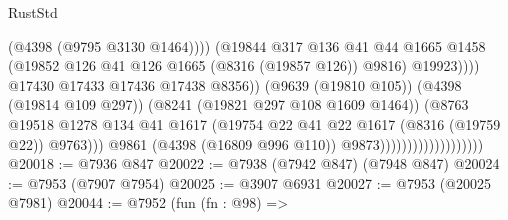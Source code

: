 \begin{lexlean}{RustStd}
\begin{coremodule}
                                                          (@4398 (@9795 @3130 @1464))))
                                                      (@19844
                                                        @317
                                                        @136
                                                        @41
                                                        @44
                                                        @1665
                                                        @1458
                                                        (@19852
                                                          @126
                                                          @41
                                                          @126
                                                          @1665
                                                          (@8316 (@19857 @126))
                                                          @9816)
                                                        @19923))))
                                                @17430
                                                @17433
                                                @17436
                                                @17438
                                                @8356))
                                            (@9639 (@19810 @105))
                                            (@4398 (@19814 @109 @297))
                                            (@8241 (@19821 @297 @108 @1609 @1464))
                                            (@8763
                                              @19518
                                              @1278
                                              @134
                                              @41
                                              @1617
                                              (@19754
                                                @22
                                                @41
                                                @22
                                                @1617
                                                (@8316 (@19759 @22))
                                                @9763)))
                                          @9861
                                          (@4398 (@16809 @996 @110))
                                          @9873)))))))))))))))))))
@20018 := @7936 @847
@20022 := @7938 (@7942 @847) (@7948 @847)
@20024 := @7953 (@7907 @7954)
@20025 := @3907 @6931
@20027 := @7953 (@20025 @7981)
@20044 := @7952
    (fun (fn : @98) =>

\end{coremodule}
\end{lexlean}
